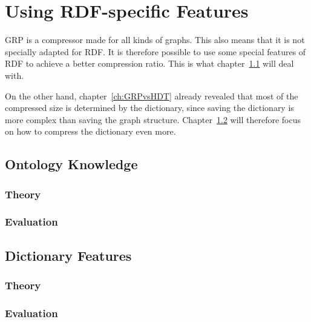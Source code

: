 \chapter{Using RDF-specific Features}\label{ch:rdfSpecificFeatures}

GRP is a compressor made for all kinds of graphs. This also means that it is not specially adapted for RDF. It is therefore possible to use some special features of RDF to achieve a better compression ratio. This is what chapter~\ref{sec:ontKnowledge} will deal with.

On the other hand, chapter~\ref{ch:GRPvsHDT} already revealed that most of the compressed size is determined by the dictionary, since saving the dictionary is more complex than saving the graph structure. Chapter~\ref{sec:dictFeatures} will therefore focus on how to compress the dictionary even more.

\section{Ontology Knowledge}\label{sec:ontKnowledge}

\subsection{Theory}

\subsection{Evaluation}

\section{Dictionary Features}\label{sec:dictFeatures}

\subsection{Theory}

\subsection{Evaluation}



